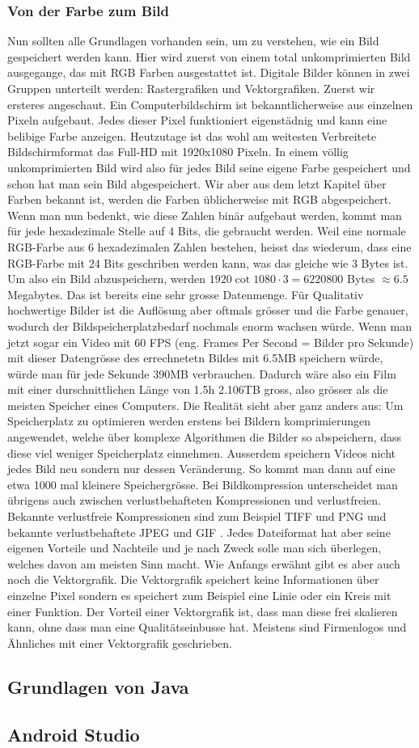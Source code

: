 \subsubsection{Von der Farbe zum Bild}
Nun sollten alle Grundlagen vorhanden sein, um zu verstehen, wie ein Bild gespeichert werden kann. Hier wird zuerst von einem total unkomprimierten Bild ausgegange, das mit RGB Farben ausgestattet ist. Digitale Bilder können in zwei Gruppen unterteilt werden: Rastergrafiken und Vektorgrafiken. Zuerst wir ersteres angeschaut. Ein Computerbildschirm ist bekanntlicherweise aus einzelnen Pixeln aufgebaut. Jedes dieser Pixel funktioniert eigenstädnig und kann eine belibige Farbe anzeigen. Heutzutage ist das wohl am weitesten Verbreitete Bildschirmformat das Full-HD mit 1920x1080 Pixeln. In einem völlig unkomprimierten Bild wird also für jedes Bild seine eigene Farbe gespeichert und schon hat man sein Bild abgespeichert. Wir aber aus dem letzt Kapitel über Farben bekannt ist, werden die Farben üblicherweise mit RGB abgespeichert. Wenn man nun bedenkt, wie diese Zahlen binär aufgebaut werden, kommt man für jede hexadezimale Stelle auf 4 Bits, die gebraucht werden. Weil eine normale RGB-Farbe aus 6 hexadezimalen Zahlen bestehen, heisst das wiederum, dass eine RGB-Farbe mit 24 Bits geschriben werden kann, was das gleiche wie 3 Bytes ist. Um also ein Bild abzuspeichern, werden $1920 \cot 1080 \cdot 3=6220800$ Bytes $ \approx  6.5$ Megabytes. Das ist bereits eine sehr grosse Datenmenge. Für Qualitativ hochwertige Bilder ist die Auflösung aber oftmals grösser und die Farbe genauer, wodurch der Bildspeicherplatzbedarf nochmals enorm wachsen würde. Wenn man jetzt sogar ein Video mit 60 FPS (eng. Frames Per Second = Bilder pro Sekunde) mit dieser Datengrösse des errechnetetn Bildes mit 6.5MB  speichern würde, würde man für jede Sekunde 390MB verbrauchen. Dadurch wäre also ein Film mit einer durschnittlichen Länge von 1.5h 2.106TB gross, also grösser als die meisten Speicher eines Computers. Die Realität sieht aber ganz anders aus: Um Speicherplatz zu optimieren werden erstens bei Bildern komprimierungen angewendet, welche über komplexe Algorithmen die Bilder so abspeichern, dass diese viel weniger Speicherplatz einnehmen. Ausserdem speichern Videos nicht jedes Bild neu sondern nur dessen Veränderung. So kommt man dann auf eine etwa 1000 mal kleinere Speichergrösse. Bei Bildkompression unterscheidet man übrigens auch zwischen verlustbehafteten Kompressionen und verlustfreien. Bekannte verlustfreie Kompressionen sind zum Beispiel TIFF und PNG und bekannte verlustbehaftete JPEG und GIF \cite{Dateiformate}. Jedes Dateiformat hat aber seine eigenen Vorteile und Nachteile und je nach Zweck solle man sich überlegen, welches davon am meisten Sinn macht. Wie Anfangs erwähnt gibt es aber auch noch die Vektorgrafik. Die Vektorgrafik speichert keine Informationen über einzelne Pixel sondern es speichert zum Beispiel eine Linie oder ein Kreis mit einer Funktion. Der Vorteil einer Vektorgrafik ist, dass man diese frei skalieren kann, ohne dass man eine Qualitätseinbusse hat. Meistens sind Firmenlogos und Ähnliches mit einer Vektorgrafik geschrieben.
\subsection{Grundlagen von Java}

\subsection{Android Studio}